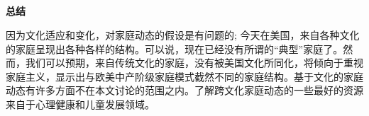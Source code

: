 \documentclass[12pt]{article}
\begin{document}
\begin{spacing}{1.25}
{			\subsection{}
			\textbf{总结}
			
			因为文化适应和变化，对家庭动态的假设是有问题的; 今天在美国，来自各种文化的家庭呈现出各种各样的结构。可以说，现在已经没有所谓的“典型”家庭了。然而，我们可以预期，来自传统文化的家庭，没有被美国文化所同化，将倾向于重视家庭主义，显示出与欧美中产阶级家庭模式截然不同的家庭结构。基于文化的家庭动态有许多方面不在本文讨论的范围之内。了解跨文化家庭动态的一些最好的资源来自于心理健康和儿童发展领域。
						
		}
	\end{spacing}
	
\end{document}
